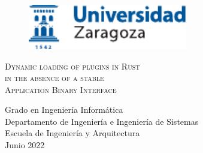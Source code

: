 \documentclass[a4paper,12pt,twoside,hidelinks,openright]{book}
\begin{document}
\begin{titlepage}


\vspace*{-4mm}
\begin{figure}[!h]
  \centering
	\includegraphics[width=69.62mm]{Imagenes/UnizarLogo}
\end{figure}

\vspace*{17mm}

\fontsize{28pt}{28pt}\selectfont
\begin{center}
\setlength{\fboxsep}{3.4mm}
\end{center}

\vspace*{18.7mm}


\fontsize{22pt}{22pt}\selectfont
\begin{center}
\textsc{Dynamic loading of plugins in Rust \\
in the absence of a stable \\
Application Binary Interface}
\end{center}

\vspace*{1cm} 
\baselineskip 36pt
\begin{center}

\fontsize{14pt}{14pt}\selectfont
{}
\vspace*{0mm} 
\fontsize{18pt}{18pt}\selectfont
{}

\vspace*{0.5cm}
\baselineskip 36pt

\fontsize{14pt}{14pt}\selectfont
{}
\vspace*{0mm}
\fontsize{15pt}{15pt}\selectfont
{}

\end{center}

\setcounter{footnote}{1}

\vspace*{35mm}
\fontsize{14pt}{14pt}\selectfont
\begin{center}
Grado en Ingeniería Informática\\ \medskip
Departamento de Ingeniería e Ingeniería de Sistemas\\
Escuela de Ingeniería y Arquitectura\\ \bigskip
Junio 2022\\
\end{center}


\renewcommand{\thefootnote}{\arabic{footnote}}
\end{titlepage}
\newpage
\end{document}
